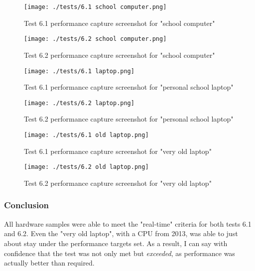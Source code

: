 \label{sec:evidence6}
\begin{figure}[H]
	\texttt{[image: ./tests/6.1 school computer.png]}
	\caption{Test 6.1 performance capture screenshot for "school computer"}
\end{figure}
\begin{figure}[H]
	\texttt{[image: ./tests/6.2 school computer.png]}
	\caption{Test 6.2 performance capture screenshot for "school computer"}
\end{figure}
\begin{figure}[H]
	\texttt{[image: ./tests/6.1 laptop.png]}
	\caption{Test 6.1 performance capture screenshot for "personal school laptop"}
\end{figure}
\begin{figure}[H]
	\texttt{[image: ./tests/6.2 laptop.png]}
	\caption{Test 6.2 performance capture screenshot for "personal school laptop"}
\end{figure}
\begin{figure}[H]
	\texttt{[image: ./tests/6.1 old laptop.png]}
	\caption{Test 6.1 performance capture screenshot for "very old laptop"}
\end{figure}
\begin{figure}[H]
	\texttt{[image: ./tests/6.2 old laptop.png]}
	\caption{Test 6.2 performance capture screenshot for "very old laptop"}
\end{figure}

\subsubsection*{Conclusion}
All hardware samples were able to meet the "real-time" criteria for both tests 6.1 and 6.2. Even the "very old laptop", with a CPU from 2013, was able to just about stay under the performance targets set. As a result, I can say with confidence that the test was not only met but \textit{exceeded}, as performance was actually better than required. 